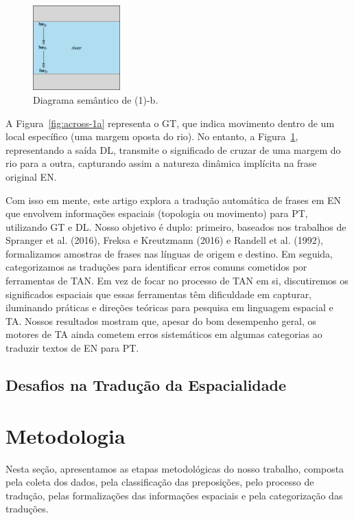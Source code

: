 \documentclass[a4paper, twocolumn, 11pt, twoside]{article}
\begin{document}
\begin{figure}[ht]
  \centering
  \includegraphics[width=0.3\textwidth]{bb-b-2.jpg}
  \caption{Diagrama semântico de (1)-b.}\label{fig:across-1b}
\end{figure}


A Figura~\ref{fig:across-1a} representa o GT, que indica movimento dentro de um local específico (uma margem oposta do rio). No entanto, a Figura~\ref{fig:across-1b}, representando a saída DL, transmite o significado de cruzar de uma margem do rio para a outra, capturando assim a natureza dinâmica implícita na frase original EN. 

Com isso em mente, este artigo explora a tradução automática de frases em EN que envolvem informações espaciais (topologia ou movimento) para PT, utilizando GT e DL. Nosso objetivo é duplo: primeiro, baseados nos trabalhos de Spranger et al. (2016), Freksa e Kreutzmann (2016) e Randell et al. (1992), formalizamos amostras de frases nas línguas de origem e destino. Em seguida, categorizamos as traduções para identificar erros comuns cometidos por ferramentas de TAN. Em vez de focar no processo de TAN em si, discutiremos os significados espaciais que essas ferramentas têm dificuldade em capturar, iluminando práticas e direções teóricas para pesquisa em linguagem espacial e TA. Nossos resultados mostram que, apesar do bom desempenho geral, os motores de TA ainda cometem erros sistemáticos em algumas categorias ao traduzir textos de EN para PT.


\subsection{Desafios na Tradução da Espacialidade}

\section{Metodologia}
Nesta seção, apresentamos as etapas metodológicas do nosso trabalho, composta pela coleta dos dados, pela classificação das preposições, pelo processo de tradução, pelas formalizações das informações espaciais e pela categorização das traduções. 
\end{document}
